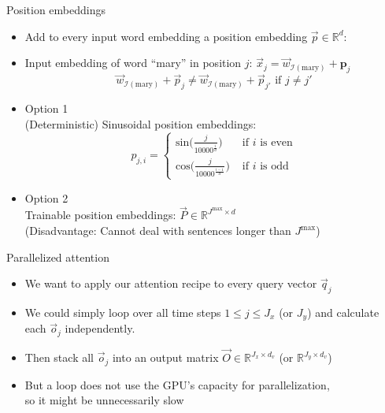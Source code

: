 \documentclass[11pt,compress,t,notes=noshow, xcolor=table]{beamer}
\begin{document}
\begin{vbframe}{Position embeddings}

\vfill

\begin{itemize}
\item Add to every input word embedding a position embedding $\vec {p} \in \mathbb{R}^d$:
\item Input embedding of word ``mary'' in position $j$: $\vec {x}_j = \vec {w}_{\mathcal{I}(\text{mary})} + \mathbf{p}_j$
$$\vec {w}_{\mathcal{I}(\text{mary})} + \vec {p}_j \neq \vec{w}_{\mathcal{I}(\text{mary})} + \vec {p}_{j'} \text{ if } j \neq j'$$
\item Option 1 \\ 
(Deterministic) Sinusoidal position embeddings: 
$$p_{j,i} = \begin{cases} \mathrm{sin}\big(\frac{j}{10000^\frac{i}{d}}\big)  & \text{ if } i \text{ is even} \\ \mathrm{cos}\big(\frac{j}{10000^\frac{i-1}{d}}\big) & \text{ if } i \text{ is odd}  \end{cases}$$
\item Option 2 \\
Trainable position embeddings: $\vec {P} \in \mathbb{R}^{J^\mathrm{max} \times d}$\\
(Disadvantage: Cannot deal with sentences longer than $J^\mathrm{max}$)
\end{itemize}

\vfill

\end{vbframe}


\begin{vbframe}{Parallelized attention}

\vfill

\begin{itemize}
\item We want to apply our attention recipe to every query vector $\vec q_j$
\item We could simply loop over all time steps $1 \leq j \leq J_x$ (or $J_y$) and calculate each $\vec o_j$ independently.
\item Then stack all $\vec o_j$ into an output matrix $\vec O \in \mathbb{R}^{J_x \times d_v}$ (or $\mathbb{R}^{J_y \times d_v}$)
\item But a loop does not use the GPU's capacity for parallelization,\\ so it might be unnecessarily slow
\end{itemize}

\vfill

\end{vbframe}
\end{document}
